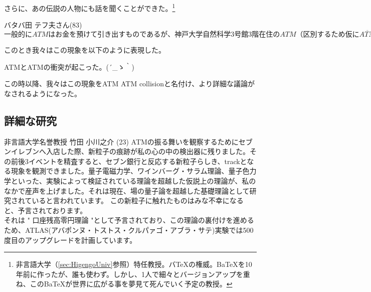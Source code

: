 さらに、あの伝説の人物にも話を聞くことができた。\footnote{非言語大学（\ref{sec:HigengoUniv}参照）特任教授。バTeXの権威。BaTeXを10年前に作ったが、誰も使わず。しかし、1人で細々とバージョンアップを重ね、このBaTeXが世界に広がる事を夢見て死んでいく予定の教授。} \\
\begin{itembox}[c]{バタバ田 テフ夫さん(83) }
$一般的にATMはお金を預けて引き出すものであるが、神戸大学自然科学3号館3階在住のATM（区別するため仮に\overline{ATM}とする。）はこれとは逆の性質を持ち、お金を借り入れることができる。
このことから一部では\overline{ATM}がATMの反物質ではないかという理論予想がされていた。
これを実験的に確かめる方法は容易で、ATMと\overline{ATM}が衝突した時に対消滅を起こせば\overline{ATM}はATMの反物質であると断定できる。
しかしATMは反応断面積・ルミノシティ共に非常に小さいため、これを観測するのは至難の技であり、今日（こんにち）まで観測を行った人間は誰一人としていなかった。
そしてこの日、我々は奇跡的にその観測を成功させたのである。
ところが、ATMは消滅することなく、お金をATMから\overline{ATM}に与える形での相互作用を起こした。
こうして前述の理論は白紙に戻ったわけであるが、この観測がATM理論のブレイクスルーとなることを私は期待している。$
\end{itembox}

このとき我々はこの現象を以下のように表現した。\\
\begin{center}
{\LARGE \mc ATMとATMの衝突が起こった。{\sf (´\_ゝ｀)}}
\end{center}

この時以降、我々はこの現象をATM ATM collisionと名付け、より詳細な議論がなされるようになった。


\subsection{詳細な研究}

\begin{itembox}[c]{非言語大学名誉教授 竹田 小川之介 (23)}
ATMの振る舞いを観察するためにセブンイレブンへ入店した際、新粒子の痕跡が私の心の中の検出器に残りました。その前後3イベントを精査すると、セブン銀行と反応する新粒子らしき、trackとなる現象を観測できました。量子電磁力学、ワインバーグ・サラム理論、量子色力学といった、実験によって検証されている理論を超越した仮説上の理論が、私のなかで産声を上げました。それは現在、場の量子論を超越した基礎理論として研究されていると言われています。
この新粒子に触れたものはみな不幸になると、予言されております。\\
それは " 口座残高零円理論 "として予言されており、この理論の裏付けを進めるため、ATLAS(アバポンヌ・トストス・クルパァゴ・アブラ・サテ)実験では500度目のアップグレードを計画しています。
\end{itembox}

